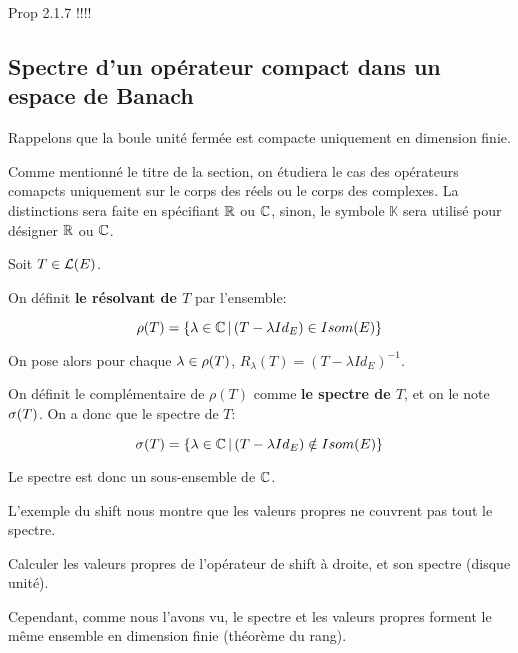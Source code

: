 Prop 2.1.7 !!!!

\subsection{Spectre d'un opérateur compact dans un espace de Banach}

Rappelons que la boule unité fermée est compacte uniquement en dimension finie.

Comme mentionné le titre de la section, on étudiera le cas des opérateurs
comapcts uniquement sur le corps des réels ou le corps des complexes. La
distinctions sera faite en spécifiant $\mathbb{R}$ ou $\mathbb{C}$, sinon, le symbole
$\mathbb{K}$ sera utilisé pour désigner $\mathbb{R}$ ou $\mathbb{C}$.

\begin{definition}
	Soit $T \in \mathcal{L}(E)$.

	On définit \textbf{le résolvant de $T$} par l'ensemble:

	\begin{equation}
		\rho(T) = \left\{\lambda \in \mathbb{C} \, | \, (T - \lambda
			{Id}_{E}) \in Isom(E) \right\}
			\label{def:resolvant_operator}
	\end{equation}

	On pose alors pour chaque $\lambda \in \rho(T)$, $R_{\lambda}(T) = (T -
	\lambda Id_{E})^{-1}$.

	On définit le complémentaire de $\rho(T)$ comme \textbf{le spectre de $T$},
	et on le note $\sigma(T)$.
	On a donc que le spectre de $T$:

	\begin{equation}
		\sigma(T) = \left\{\lambda \in \mathbb{C} \, | \, (T - \lambda {Id}_{E})
		\notin Isom(E) \right\}
		\label{def:spectrum_operator}
	\end{equation}
\end{definition}

Le spectre est donc un sous-ensemble de $\mathbb{C}$.

L'exemple du shift nous montre que les valeurs propres ne couvrent pas tout le
spectre.

\begin{exercice}
	Calculer les valeurs propres de l'opérateur de shift à droite, et son
	spectre (disque unité).
\end{exercice}

Cependant, comme nous l'avons vu, le spectre et les valeurs propres forment le
même ensemble en dimension finie (théorème du rang).


